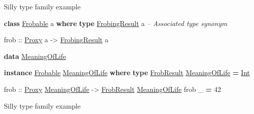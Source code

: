 \documentclass[ignorenonframetext,]{beamer}
\newenvironment{Shaded}{}{}
\newcommand{\KeywordTok}[1]{\textcolor[rgb]{0.26,0.66,0.93}{\textbf{{#1}}}}
\newcommand{\DataTypeTok}[1]{\underline{{#1}}}
\newcommand{\DecValTok}[1]{\textcolor[rgb]{0.27,0.67,0.26}{{#1}}}
\newcommand{\CommentTok}[1]{\textcolor[rgb]{0.00,0.40,1.00}{\textit{{#1}}}}
\newcommand{\OtherTok}[1]{{#1}}
\newcommand{\FunctionTok}[1]{\textcolor[rgb]{1.00,0.58,0.35}{\textbf{{#1}}}}
\newcommand{\NormalTok}[1]{{#1}}
\begin{document}
\begin{frame}[fragile]{Silly type family example}

\begin{Shaded}
\begin{Highlighting}[]

\KeywordTok{class} \DataTypeTok{Frobable} \NormalTok{a }\KeywordTok{where}
  \KeywordTok{type} \DataTypeTok{FrobingResult} \NormalTok{a }\CommentTok{-- Associated type synonym}

\OtherTok{  frob ::} \DataTypeTok{Proxy} \NormalTok{a }\OtherTok{->} \DataTypeTok{FrobingResult} \NormalTok{a}

\KeywordTok{data} \DataTypeTok{MeaningOfLife}

\KeywordTok{instance} \DataTypeTok{Frobable} \DataTypeTok{MeaningOfLife} \KeywordTok{where}
  \KeywordTok{type} \DataTypeTok{FrobResult} \DataTypeTok{MeaningOfLife} \FunctionTok{=} \DataTypeTok{Int}

\OtherTok{  frob ::} \DataTypeTok{Proxy} \DataTypeTok{MeaningOfLife} \OtherTok{->} \DataTypeTok{FrobResult} \DataTypeTok{MeaningOfLife}
  \NormalTok{frob _ }\FunctionTok{=} \DecValTok{42}
\end{Highlighting}
\end{Shaded}

\end{frame}

\begin{frame}[fragile]{Silly type family example}

\begin{Shaded}
\end{Shaded}

\end{frame}
\end{document}
